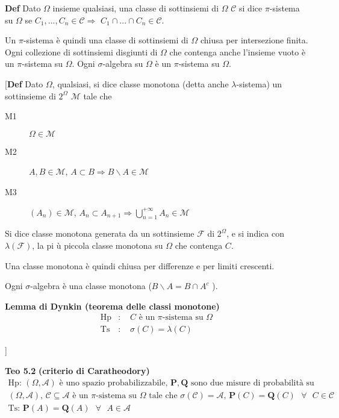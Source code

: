 \documentclass{article}
\begin{document}
\textbf{Def} Dato $\Omega $ insieme qualsiasi, una classe di sottinsiemi di $%
\Omega $ $\mathcal{C}$ si dice $\pi $-sistema su $\Omega $ se $%
C_{1},...,C_{n}\in \mathcal{C\Longrightarrow }$ $C_{1}\cap ...\cap C_{n}\in 
\mathcal{C}$.

Un $\pi $-sistema \`{e} quindi una classe di sottinsiemi di $\Omega $ chiusa
per intersezione finita. Ogni collezione di sottinsiemi disgiunti di $\Omega 
$ che contenga anche l'insieme vuoto \`{e} un $\pi $-sistema su $\Omega $.
Ogni $\sigma $-algebra su $\Omega $ \`{e} un $\pi $-sistema su $\Omega $.

[\textbf{Def} Dato $\Omega $, qualsiasi, si dice classe monotona (detta
anche $\lambda $-sistema) un sottinsieme di $2^{\Omega }$ $\mathcal{M}$ tale
che

\begin{description}
\item[M1] $\Omega \in \mathcal{M}$

\item[M2] $A,B\in \mathcal{M}$, $A\subset B\Longrightarrow B\backslash A\in 
\mathcal{M}$

\item[M3] $\left( A_{n}\right) \in \mathcal{M}$, $A_{n}\subset
A_{n+1}\Longrightarrow \bigcup_{n=1}^{+\infty }A_{n}\in \mathcal{M}$
\end{description}

Si dice classe monotona generata da un sottinsieme $\mathcal{F}$ di $%
2^{\Omega }$, e si indica con $\lambda \left( \mathcal{F}\right) $, la pi%
\`{u} piccola classe monotona su $\Omega $ che contenga $C$.

Una classe monotona \`{e} quindi chiusa per differenze e per limiti
crescenti.

Ogni $\sigma $-algebra \`{e} una classe monotona ($B\backslash A=B\cap A^{c}$%
).

\textbf{Lemma di Dynkin (teorema delle classi monotone)}%
\begin{eqnarray*}
\text{Hp} &\text{: }&C\text{ \`{e} un }\pi \text{-sistema su }\Omega \\
\text{Ts} &\text{: }&\sigma \left( C\right) =\lambda \left( C\right)
\end{eqnarray*}

]

\textbf{Teo 5.2} \textbf{(criterio di Caratheodory) }%
\begin{gather*}
\text{Hp: }\left( \Omega ,\mathcal{A}\right) \text{ \`{e} uno spazio
probabilizzabile, }\mathbf{P,Q}\text{ sono due misure di probabilit\`{a} su }
\\
\left( \Omega ,\mathcal{A}\right) \text{, }\mathcal{C}\subseteq \mathcal{A}%
\text{ \`{e} un }\pi \text{-sistema su }\Omega \text{ tale che }\sigma
\left( \mathcal{C}\right) =\mathcal{A}\text{, }\mathbf{P}\left( C\right) =%
\mathbf{Q}\left( C\right) \text{ }\forall \text{ }C\in \mathcal{C} \\
\text{Ts: }\mathbf{P}\left( A\right) =\mathbf{Q}\left( A\right) \text{ }%
\forall \text{ }A\in \mathcal{A}
\end{gather*}
\end{document}
